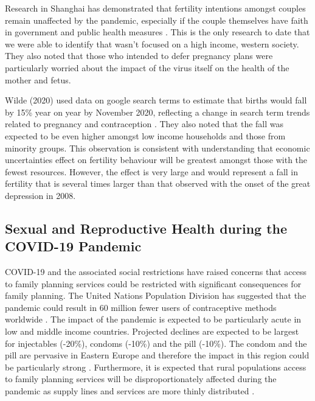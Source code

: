 \documentclass[10pt,letterpaper]{article}
\begin{document}
Research in Shanghai has demonstrated that fertility intentions amongst couples remain unaffected by the pandemic, especially if the couple themselves have faith in government and public health measures \cite{zhu2020fertility}. This is the only research to date that we were able to identify that wasn't focused on a high income, western society. They also noted that those who intended to defer pregnancy plans were particularly worried about the impact of the virus itself on the health of the mother and fetus.

Wilde (2020) used data on google search terms to estimate that births would fall by 15\% year on year by November 2020, reflecting a change in search term trends related to pregnancy and contraception \cite{wilde2020covid}. They also noted that the fall was expected to be even higher amongst low income households and those from minority groups. This observation is consistent with understanding that economic uncertainties effect on fertility behaviour will be greatest amongst those with the fewest resources. However, the effect is very large and would represent a fall in fertility that is several times larger than that observed with the onset of the great depression in 2008.

\subsection*{Sexual and Reproductive Health during the COVID-19 Pandemic}

COVID-19 and the associated social restrictions have raised concerns that access to family planning services could be restricted with significant consequences for family planning. The United Nations Population Division has suggested that the pandemic could result in 60 million fewer users of contraceptive methods worldwide \cite{dasgupta2020impact}. The impact of the pandemic is expected to be particularly acute in low and middle income countries. Projected declines are expected to be largest for injectables (-20\%), condoms (-10\%) and the pill (-10\%). The condom and the pill are pervasive in Eastern Europe and therefore the impact in this region could be particularly strong \cite{eeckhaut2014using}. Furthermore, it is expected that rural populations access to family planning services will be disproportionately affected during the pandemic as supply lines and services are more thinly distributed \cite{dasgupta2020impact}.
\end{document}
